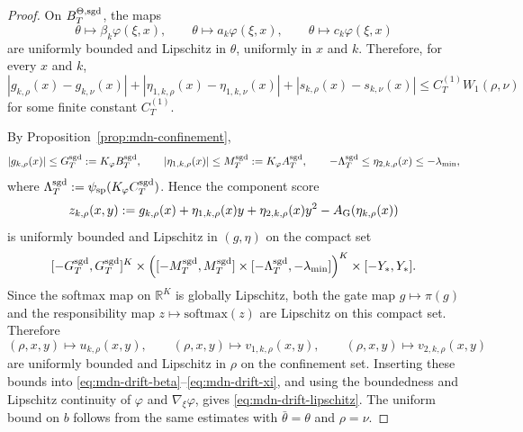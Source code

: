 \documentclass[11pt]{article}
\theoremstyle{definition}
\newcommand{\R}{\mathbb{R}}
\newcommand{\softmax}{\mathrm{softmax}}
\begin{document}
\begin{proof}
On $B_T^{\Theta,\rm sgd}$, the maps
\[
  \theta\mapsto \beta_k\varphi(\xi,x),
  \qquad
  \theta\mapsto a_k\varphi(\xi,x),
  \qquad
  \theta\mapsto c_k\varphi(\xi,x)
\]
are uniformly bounded and Lipschitz in $\theta$, uniformly in $x$ and $k$.
Therefore, for every $x$ and $k$,
\[
  |g_{k,\rho}(x)-g_{k,\nu}(x)|
  +
  |\eta_{1,k,\rho}(x)-\eta_{1,k,\nu}(x)|
  +
  |s_{k,\rho}(x)-s_{k,\nu}(x)|
  \le
  C_T^{(1)} W_1(\rho,\nu)
\]
for some finite constant $C_T^{(1)}$.

By Proposition~\ref{prop:mdn-confinement},
\[
  |g_{k,\rho}(x)|\le G_T^{\rm sgd}:=K_\varphi B_T^{\rm sgd},
  \qquad
  |\eta_{1,k,\rho}(x)|\le M_T^{\rm sgd}:=K_\varphi A_T^{\rm sgd},
  \qquad
  -\Lambda_T^{\rm sgd}\le \eta_{2,k,\rho}(x)\le -\lambda_{\min},
\]
where $\Lambda_T^{\rm sgd}:=\psi_{\rm sp}(K_\varphi C_T^{\rm sgd})$. Hence the
component score
\[
  z_{k,\rho}(x,y)
  :=
  g_{k,\rho}(x)
  +
  \eta_{1,k,\rho}(x)y
  +
  \eta_{2,k,\rho}(x)y^2
  -
  A_{\rm G}(\eta_{k,\rho}(x))
\]
is uniformly bounded and Lipschitz in $(g,\eta)$ on the compact set
\[
  [-G_T^{\rm sgd},G_T^{\rm sgd}]^K
  \times
  \Big(
    [-M_T^{\rm sgd},M_T^{\rm sgd}]
    \times
    [-\Lambda_T^{\rm sgd},-\lambda_{\min}]
  \Big)^K
  \times
  [-Y_\ast,Y_\ast].
\]
Since the softmax map on $\R^K$ is globally Lipschitz, both the gate map
$g\mapsto \pi(g)$ and the responsibility map $z\mapsto \softmax(z)$ are
Lipschitz on this compact set. Therefore
\[
  (\rho,x,y)\mapsto u_{k,\rho}(x,y),
  \qquad
  (\rho,x,y)\mapsto v_{1,k,\rho}(x,y),
  \qquad
  (\rho,x,y)\mapsto v_{2,k,\rho}(x,y)
\]
are uniformly bounded and Lipschitz in $\rho$ on the confinement set. Inserting
these bounds into \eqref{eq:mdn-drift-beta}--\eqref{eq:mdn-drift-xi}, and using
the boundedness and Lipschitz continuity of $\varphi$ and $\nabla_\xi\varphi$,
gives \eqref{eq:mdn-drift-lipschitz}. The uniform bound on $b$ follows from the
same estimates with $\bar\theta=\theta$ and $\rho=\nu$.
\end{proof}
\end{document}
